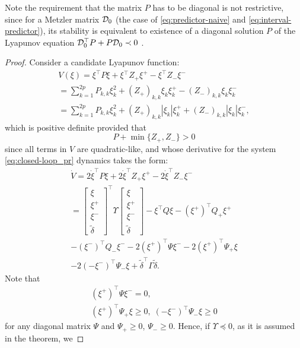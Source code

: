 \documentclass[letterpaper, 10 pt, conference]{ieeeconf}  %
\begin{document}
Note the requirement that the matrix $P$ has to be diagonal is not
restrictive, since for a Metzler matrix $\mathcal{D}_{0}$ (the case of \eqref{eq:predictor-naive}
and \eqref{eq:interval-predictor}), its stability is equivalent to
existence of a diagonal solution $P$ of the Lyapunov equation $\mathcal{D}_{0}^{\top}P+P\mathcal{D}_{0}\prec0$
\cite{Positive}.
\begin{proof}
Consider a candidate Lyapunov function:
\begin{gather*}
V(\xi)=\xi^{\top}P\xi+\xi{}^{\top}Z_{+}\xi^{+}-\xi^{\top}Z_{-}\xi^{-}\\
=\sum_{k=1}^{2p}P_{k,k}\xi_{k}^{2}+(Z_{+})_{k,k}\xi_{k}\xi_{k}^{+}-(Z_{-})_{k,k}\xi_{k}\xi_{k}^{-}\\
=\sum_{k=1}^{2p}P_{k,k}\xi_{k}^{2}+(Z_{+})_{k,k}|\xi_{k}|\xi_{k}^{+}+(Z_{-})_{k,k}|\xi_{k}|\xi_{k}^{-},
\end{gather*}
which is positive definite provided that
\[
P+\min\{Z_{+},Z_{-}\}>0
\]
since all terms in $V$ are quadratic-like, and whose derivative for
the system \eqref{eq:closed-loop_pr} dynamics takes the form:
\begin{gather*}
\dot{V}=2\dot{\xi}^{\top}P\xi+2\dot{\xi}^{\top}Z_{+}\xi^{+}-2\dot{\xi}^{\top}Z_{-}\xi^{-}\\
=\left[\begin{array}{c}
\xi\\
\xi^{+}\\
\xi^{-}\\
\tilde{\delta}
\end{array}\right]^{\top}\Upsilon\left[\begin{array}{c}
\xi\\
\xi^{+}\\
\xi^{-}\\
\tilde{\delta}
\end{array}\right]-\xi^{\top}Q\xi-(\xi^{+})^{\top}Q_{+}\xi^{+}\\
-(\xi^{-})^{\top}Q_{-}\xi^{-}-2(\xi^{+})^{\top}\Psi\xi^{-}-2(\xi^{+})^{\top}\Psi_{+}\xi\\
-2(-\xi^{-})^{\top}\Psi_{-}\xi+\tilde{\delta}^{\top}\Gamma\tilde{\delta}.
\end{gather*}
Note that
\begin{gather*}
(\xi^{+})^{\top}\Psi\xi^{-}=0,\\
(\xi^{+})^{\top}\Psi_{+}\xi\geq0,\;(-\xi^{-})^{\top}\Psi_{-}\xi\geq0
\end{gather*}
for any diagonal matrix $\Psi$ and $\Psi_{+}\geq0$, $\Psi_{-}\geq0$.
Hence, if $\Upsilon\preceq0$, as it is assumed in the theorem, we

\end{proof}
\end{document}
